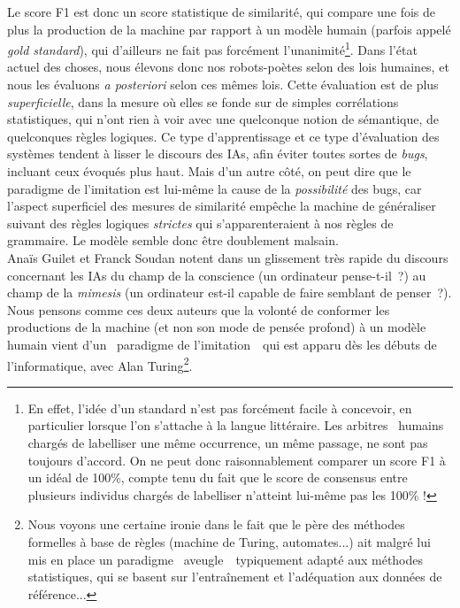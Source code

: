 \documentclass{article}
\begin{document}
					Le score F1 est donc un score statistique de similarité, qui compare une fois de plus la production de la machine par rapport à un modèle humain (parfois appelé \textit{gold standard}), qui d'ailleurs ne fait pas forcément l'unanimité\footnote{En effet, l'idée d'un standard n'est pas forcément facile à concevoir, en particulier lorsque l'on s'attache à la langue littéraire. Les  \guillemotleft arbitres\guillemotright~ humains chargés de labelliser une même occurrence, un même passage, ne sont pas toujours d'accord. On ne peut donc raisonnablement comparer un score F1 à un idéal de 100\%, compte tenu du fait que le score de consensus entre plusieurs individus chargés de labelliser n'atteint lui-même pas les 100\% !}. Dans l'état actuel des choses, nous élevons donc nos robots-poètes selon des lois humaines, et nous les évaluons \textit{a posteriori} selon ces mêmes lois. Cette évaluation est de plus \textit{superficielle}, dans la mesure où elles se fonde sur de simples corrélations statistiques, qui n'ont rien à voir avec une quelconque notion de sémantique, de quelconques règles logiques. Ce type d'apprentissage et ce type d'évaluation des systèmes tendent à lisser le discours des IAs, afin éviter toutes sortes de \textit{bugs}, incluant ceux évoqués plus haut. Mais d'un autre côté, on peut dire que le paradigme de l'imitation est lui-même la cause de la \textit{possibilité} des bugs, car l'aspect superficiel des mesures de similarité empêche la machine de généraliser suivant des règles logiques \textit{strictes} qui s'apparenteraient à nos règles de grammaire. Le modèle semble donc être doublement malsain.\\
					
					Anaïs Guilet et Franck Soudan notent dans \autocite{guilet2017} un glissement très rapide du discours concernant les IAs du champ de la conscience (un ordinateur pense-t-il~?) au champ de la \textit{mimesis} (un ordinateur est-il capable de faire semblant de penser~?). Nous pensons comme ces deux auteurs que la volonté de conformer les productions de la machine (et non son mode de pensée profond) à un modèle humain vient d'un \guillemotleft~paradigme de l'imitation~\guillemotright~qui est apparu dès les débuts de l'informatique, avec Alan Turing\footnote{Nous voyons une certaine ironie dans le fait que le père des méthodes formelles à base de règles (machine de Turing, automates...) ait malgré lui mis en place un paradigme \guillemotleft~aveugle~\guillemotright~typiquement adapté aux méthodes statistiques, qui se basent sur l'entraînement et l'adéquation aux données de référence...}. \\
					
\end{document}
